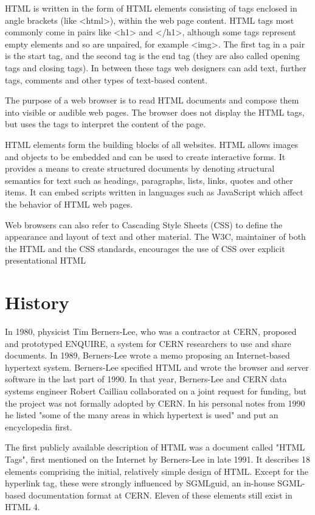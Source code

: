 HTML is written in the form of HTML elements consisting of tags enclosed in angle brackets (like <html>), within the web page content. HTML tags most commonly come in pairs like <h1> and </h1>, although some tags represent empty elements and so are unpaired, for example <img>. The first tag in a pair is the start tag, and the second tag is the end tag (they are also called opening tags and closing tags). In between these tags web designers can add text, further tags, comments and other types of text-based content.

The purpose of a web browser is to read HTML documents and compose them into visible or audible web pages. The browser does not display the HTML tags, but uses the tags to interpret the content of the page.

HTML elements form the building blocks of all websites. HTML allows images and objects to be embedded and can be used to create interactive forms. It provides a means to create structured documents by denoting structural semantics for text such as headings, paragraphs, lists, links, quotes and other items. It can embed scripts written in languages such as JavaScript which affect the behavior of HTML web pages.

Web browsers can also refer to Cascading Style Sheets (CSS) to define the appearance and layout of text and other material. The W3C, maintainer of both the HTML and the CSS standards, encourages the use of CSS over explicit presentational HTML

\chapter{History}

In 1980, physicist Tim Berners-Lee, who was a contractor at CERN, proposed and prototyped ENQUIRE, a system for CERN researchers to use and share documents. In 1989, Berners-Lee wrote a memo proposing an Internet-based hypertext system. Berners-Lee specified HTML and wrote the browser and server software in the last part of 1990. In that year, Berners-Lee and CERN data systems engineer Robert Cailliau collaborated on a joint request for funding, but the project was not formally adopted by CERN. In his personal notes from 1990 he listed "some of the many areas in which hypertext is used" and put an encyclopedia first.

The first publicly available description of HTML was a document called "HTML Tags", first mentioned on the Internet by Berners-Lee in late 1991. It describes 18 elements comprising the initial, relatively simple design of HTML. Except for the hyperlink tag, these were strongly influenced by SGMLguid, an in-house SGML-based documentation format at CERN. Eleven of these elements still exist in HTML 4.



